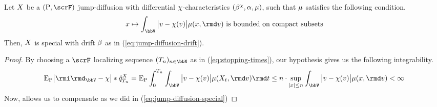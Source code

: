 \begin{lemma}
  \label{lemma:special}
  Let $X$ be a $(\Prb, \scrF)$ jump-diffusion with differential $\chi$-characteristics $(\beta^\chi, \alpha, \mu)$, such that $\mu$ satisfies the following condition.
  \begin{equation*}
    \stateVar \mapsto \int_\vecSpace \big|\markVar - \trunc(\markVar) \big| \affJump(\stateVar, \rmd\markVar) \text{ is bounded on compact subsets}
  \end{equation*}
  Then, $X$ is special with drift $\beta$ as in (\ref{eq:jump-diffusion-drift}).
\end{lemma}
\begin{proof}
  \label{proof:lemma:special}
  By choosing a $\scrF$ localizing sequence $(T_n)_{n\in\bbN}$ as in (\ref{eq:stopping-times}), our hypothesis gives us the following integrability.
  \begin{equation*}
    \Exp_\Prb\big| \id_\vecSpace- \trunc \big| \ast \predproj{\jumpMeas^\X}_{T_n}
    = \Exp_\Prb \int_0^{T_n} \int_\vecSpace \big|\markVar - \trunc(\markVar)\big| \affJump(\X_t, \rmd\markVar) \rmd t
    \leq n \cdot \sup_{|\stateVar|\leq n} \int_\vecSpace \big|\markVar-\trunc(\markVar)\big| \affJump(\stateVar, \rmd\markVar) < \infty
  \end{equation*}
  Now, \cite[Proposition II.1.28]{jacod2003} allows us to compensate as we did in (\ref{eq:jump-diffusion-special})
\end{proof}
